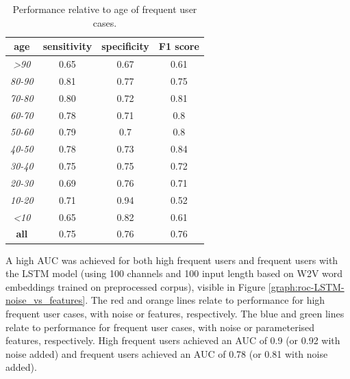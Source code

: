 \begin{table}[ht]
\setlength{\tabcolsep}{8pt}
\centering
\caption{Performance relative to age of frequent user cases.}
\label{table:age-performance}

\begin{tabular}{@{}c|ccc@{}}
\toprule
\textbf{age}           & \textbf{sensitivity} & \textbf{specificity} & \textbf{F1 score} \\ \midrule
\textit{\textgreater90} & 0.65                 & 0.67                 & 0.61              \\
\textit{80-90}         & 0.81                 & 0.77                 & 0.75              \\
\textit{70-80}         & 0.80                 & 0.72                 & 0.81              \\
\textit{60-70}         & 0.78                 & 0.71                 & 0.8               \\
\textit{50-60}         & 0.79                 & 0.7                  & 0.8               \\
\textit{40-50}         & 0.78                 & 0.73                 & 0.84              \\
\textit{30-40}         & 0.75                 & 0.75                 & 0.72              \\
\textit{20-30}         & 0.69                 & 0.76                 & 0.71              \\
\textit{10-20}         & 0.71                 & 0.94                 & 0.52              \\
\textit{\textless10}    & 0.65                 & 0.82                 & 0.61              \\ \midrule
\textbf{all}           & 0.75                 & 0.76                 & 0.76              \\ \bottomrule
\end{tabular}%

\end{table}

A high AUC was achieved for both high frequent users and frequent users with the LSTM model (using 100 channels and 100 input length based on W2V word embeddings trained on preprocessed corpus), visible in Figure \ref{graph:roc-LSTM-noise_vs_features}. The red and orange lines relate to performance for high frequent user cases, with noise or features, respectively. The blue and green lines relate to performance for frequent user cases, with noise or parameterised features, respectively.  High frequent users achieved an AUC of 0.9 (or 0.92 with noise added) and frequent users achieved an AUC of 0.78 (or 0.81 with noise added). 

